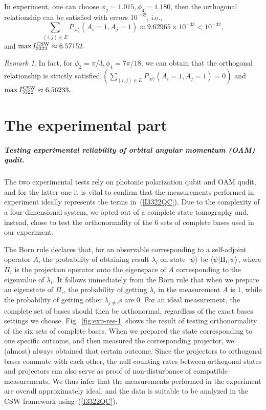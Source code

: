 \documentclass[pra,aps,notitlepage,superscriptaddress,showpacs,showkeys]{revtex4-1}
\theoremstyle{definition}
\theoremstyle{remark}
\newtheorem{remark}{Remark}
\begin{document}
In experiment, one can choose $\phi_{2}= 1.015,\phi_{4}= 1.180$, then the orthogonal relationship can be satisfied with errors $10^{-32}$, i.e.,
$$\sum_{(i,j)\in E}P_{|\psi\rangle}(A_i=1,A_j=1)\approx 9.62965\times 10^{-33}<10^{-32},$$
and $\max I_{3322}^{\rm CSW}\approx 6.57152.$



\begin{remark}
In fact, for $\phi_{2}= \pi/3,\phi_{4}=7\pi/18$, we can obtain that the orthogonal relationship is strictly satisfied  $(\sum_{(i,j)\in E}P_{|\psi\rangle}(A_i=1,A_j=1)=0)$ and $\max I_{3322}^{\rm CSW}\approx 6.56233.$
\end{remark}

\section{The experimental part}

\subparagraph{Testing experimental reliability of orbital angular momentum (OAM) qudit.} 
The two experimental tests rely on photonic polarization qubit and OAM qudit, and for the latter one it is vital to confirm that the measurements performed in experiment ideally represents the terms in~(\ref{I3322QC}).
Due to the complexity of a four-dimensional system, we opted out of a complete state tomography and, instead, chose to test the orthonormality of the 6 sets of complete bases used in our experiment. 

The Born rule declares that, for an observable corresponding to a self-adjoint operator $A$, the probability of obtaining result $\lambda_i$ on state $\ket{\psi}$ be $\braket{\psi|\Pi_i|\psi}$, where $\Pi_i$ is the projection operator onto the eigenspace of $A$ corresponding to the eigenvalue of $\lambda_i$. 
It follows immediately from the Born rule that when we prepare an eigenstate of $\Pi_i$, the probability of getting $\lambda_i$ in the measurement $A$ is $1$, while the probability of getting other $\lambda_{j\neq i}$s are $0$. 
For an ideal measurement, the complete set of bases should then be orthonormal, regardless of the exact bases settings we choose. 
Fig.~\ref{fig:exp-res-1} shows the result of testing orthonormality of the six sets of complete bases. When we prepared the state corresponding to one specific outcome, and then measured the corresponding projector, we (almost) always obtained that certain outcome.
Since the projectors to orthogonal bases commute with each other, the null counting rates between orthogonal states and projectors can also serve as proof of non-disturbance of compatible measurements. 
We thus infer that the measurements performed in the experiment are overall approximately ideal, and the data is suitable to be analyzed in the CSW framework using~(\ref{I3322QC}).
\end{document}

